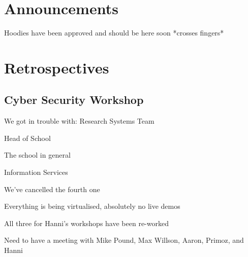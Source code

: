 \documentclass[11pt,hacksoc]{meetingmins}
\begin{document}
\maketitle

\section{Announcements}
\begin{items}
	\item
	Hoodies have been approved and should be here soon *crosses fingers*

\end{items}

\section{Retrospectives}

\subsection{Cyber Security Workshop}
\begin{hiddensubitems}
	\item
	We got in trouble with:
		\subitem
		Research Systems Team
		
		\subitem
		Head of School
		
		\subitem
		The school in general
		
		\subitem
		Information Services
		
	\item
	We've cancelled the fourth one
	
	\item
	Everything is being virtualised, absolutely no live demos
	
	\item
	All three for Hanni's workshops have been re-worked
	
	\item
	Need to have a meeting with Mike Pound, Max Willson, Aaron, Primoz, and Hanni
	
	
	
\end{hiddensubitems}
\end{document}
